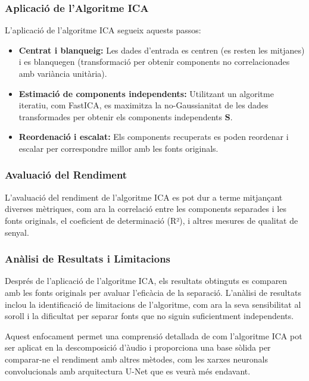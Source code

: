 \documentclass[10pt,a4paper,twocolumn,twoside]{article}
\begin{document}
\subsubsection{Aplicació de l'Algoritme ICA}

L'aplicació de l'algoritme ICA segueix aquests passos:

\begin{itemize}
    \item \textbf{Centrat i blanqueig:} Les dades d'entrada es centren (es resten les mitjanes) i es blanquegen (transformació per obtenir components no correlacionades amb variància unitària).
    \item \textbf{Estimació de components independents:} Utilitzant un algoritme iteratiu, com FastICA, es maximitza la no-Gaussianitat de les dades transformades per obtenir els components independents $\mathbf{S}$.
    \item \textbf{Reordenació i escalat:} Els components recuperats es poden reordenar i escalar per correspondre millor amb les fonts originals.
\end{itemize}

\subsubsection{Avaluació del Rendiment}

L'avaluació del rendiment de l'algoritme ICA es pot dur a terme mitjançant diverses mètriques, com ara la correlació entre les components separades i les fonts originals, el coeficient de determinació (R²), i altres mesures de qualitat de senyal.

\subsubsection{Anàlisi de Resultats i Limitacions}

Després de l'aplicació de l'algoritme ICA, els resultats obtinguts es comparen amb les fonts originals per avaluar l'eficàcia de la separació. L'anàlisi de resultats inclou la identificació de limitacions de l'algoritme, com ara la seva sensibilitat al soroll i la dificultat per separar fonts que no siguin suficientment independents.

Aquest enfocament permet una comprensió detallada de com l'algoritme ICA pot ser aplicat en la descomposició d'àudio i proporciona una base sòlida per comparar-ne el rendiment amb altres mètodes, com les xarxes neuronals convolucionals amb arquitectura U-Net que es veurà més endavant.
\end{document}

